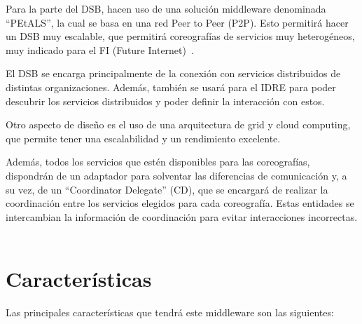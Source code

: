\documentclass[runningheads]{llncs}
\begin{document}
Para la parte del DSB, hacen uso de una solución middleware denominada ``PEtALS'', la cual se basa en una red Peer to Peer (P2P). Esto permitirá hacer un DSB muy escalable, que permitirá coreografías de servicios muy heterogéneos, muy indicado para el FI (Future Internet)~\cite{a_1}.

El DSB se encarga principalmente de la conexión con servicios distribuidos de distintas organizaciones. Además, también se usará para el IDRE para poder descubrir los servicios distribuidos y poder definir la interacción con estos. ~\cite{a_10}

Otro aspecto de diseño es el uso de una arquitectura de grid y cloud computing, que permite tener una escalabilidad y un rendimiento excelente.

Además, todos los servicios que estén disponibles para las coreografías, dispondrán de un adaptador para solventar las diferencias de comunicación y, a su vez, de un ``Coordinator Delegate'' (CD), que se encargará de realizar la coordinación entre los servicios elegidos para cada coreografía. Estas entidades se intercambian la información de coordinación para evitar interacciones incorrectas. ~\cite{a_2}

\section{Características}
Las principales características que tendrá este middleware son las siguientes:
\end{document}
